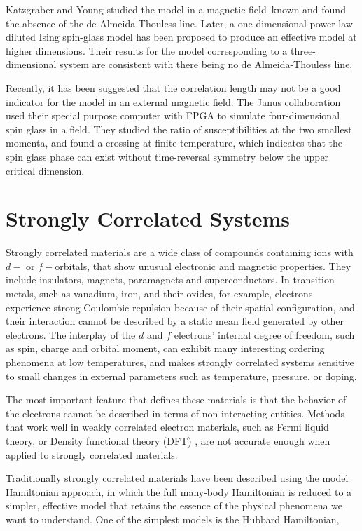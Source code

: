 Katzgraber and Young studied the model in a magnetic field--known and 
found the absence of the de Almeida-Thouless line. Later, a one-dimensional 
power-law diluted Ising spin-glass model has been proposed to produce an
effective model at higher dimensions\cite{Young-Katzgraber2004}. Their results for the model 
corresponding to a three-dimensional system are consistent with there being no 
de Almeida-Thouless line.

Recently, it has been suggested that the correlation length may not be a 
good indicator for the model in an external magnetic field.
The Janus collaboration \cite{Banos-2012,TheJanusCollaboration:2012:JFS:2322156.2322158} 
used their special purpose computer with FPGA to simulate
four-dimensional spin glass in a field. They studied the ratio of susceptibilities 
at the two smallest momenta, and found a crossing at finite temperature, which 
indicates that the spin glass phase can exist without time-reversal symmetry
below the upper critical dimension.


\section{Strongly Correlated Systems}
Strongly correlated materials are a wide class of compounds containing ions 
with $d-$ or $f-$orbitals, that show unusual electronic and magnetic properties. 
They include insulators, magnets, paramagnets and superconductors. In transition
metals, such as vanadium, iron, and their oxides, for example, electrons experience
strong Coulombic repulsion because of their spatial configuration, and their 
interaction cannot be described by a static mean field generated by other electrons.
\cite{RevModPhys.56.99,RevModPhys.70.1039}
The interplay of the $d$ and $f$ electrons' internal degree of freedom, such as
spin, charge and orbital moment, can exhibit many interesting ordering phenomena
at low temperatures, and makes strongly correlated systems sensitive to small
changes in external parameters such as temperature, pressure, or doping. 

The most important feature that defines these materials is that the behavior of the electrons
cannot be described in terms of non-interacting entities. Methods that work well
in weakly correlated electron materials, such as Fermi liquid theory, or Density
functional theory (DFT) \cite{RevModPhys.61.689}, are not accurate enough when applied to strongly 
correlated materials. 

Traditionally strongly correlated materials have been described using the model Hamiltonian 
approach, in which the full many-body Hamiltonian is reduced to a simpler, effective
model that retains the essence of the physical phenomena we want to understand.
One of the simplest models is the Hubbard Hamiltonian, 

